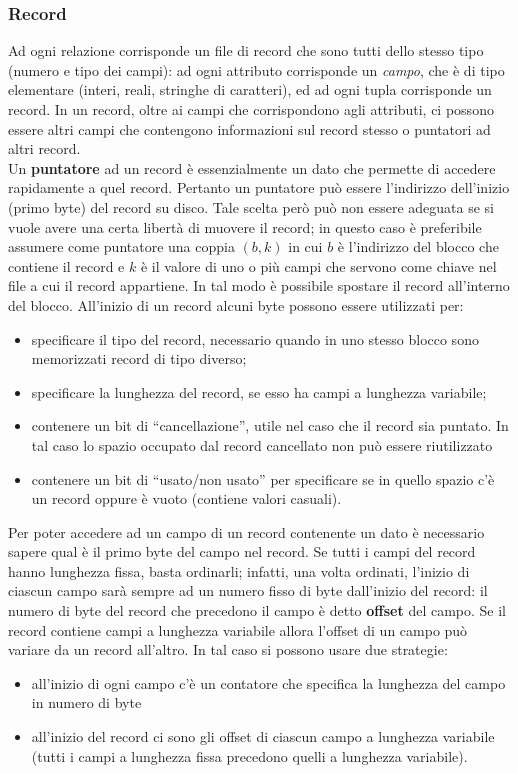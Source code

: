 \subsubsection{Record}
Ad ogni relazione corrisponde un file di record che sono tutti dello stesso tipo (numero e 
tipo dei campi): ad ogni attributo corrisponde un \emph{campo}, che è di tipo elementare (interi,
reali, stringhe di caratteri), ed ad ogni tupla corrisponde un record. In un record, oltre ai campi 
che corrispondono agli attributi, ci possono essere altri campi che contengono informazioni sul 
record stesso o puntatori ad altri record.\\
Un \textbf{puntatore} ad un record è essenzialmente un dato che permette di accedere rapidamente a quel
record. Pertanto un puntatore può essere l'indirizzo dell'inizio (primo byte) del record su disco.
Tale scelta però può non essere adeguata se si vuole avere una certa libertà di muovere il record; in
questo caso è preferibile assumere come puntatore una coppia $(b, k)$ in cui $b$ è l'indirizzo del blocco
che contiene il record e $k$ è il valore di uno o più campi che servono come chiave nel file a cui il
record appartiene. In tal modo è possibile spostare il record all'interno del blocco. All'inizio di un 
record alcuni byte possono essere utilizzati per:
\begin{itemize}
 \item specificare il tipo del record, necessario quando in uno stesso blocco sono memorizzati 
 record di tipo diverso;
 \item specificare la lunghezza del record, se esso ha campi a lunghezza variabile;
 \item contenere un bit di ``cancellazione'', utile nel caso che il record sia puntato. In tal caso 
 lo spazio occupato dal record cancellato non può essere riutilizzato
 \item contenere un bit di ``usato/non usato'' per specificare se in quello spazio c'è un record oppure
 è vuoto (contiene valori casuali).
\end{itemize}

Per poter accedere ad un campo di un record contenente un dato è necessario sapere qual è il primo
byte del campo nel record. Se tutti i campi del record hanno lunghezza fissa, basta ordinarli; infatti,
una volta ordinati, l'inizio di ciascun campo sarà sempre ad un numero fisso di byte dall'inizio del
record: il numero di byte del record che precedono il campo è detto \textbf{offset} del campo. Se il record
contiene campi a lunghezza variabile allora l'offset di un campo può variare da un record all'altro.
In tal caso si possono usare due strategie:
\begin{itemize}
 \item all'inizio di ogni campo c'è un contatore che specifica la lunghezza del campo in numero di
byte
\item all'inizio del record ci sono gli offset di ciascun campo a lunghezza variabile (tutti i campi 
a lunghezza fissa precedono quelli a lunghezza variabile).
\end{itemize}

